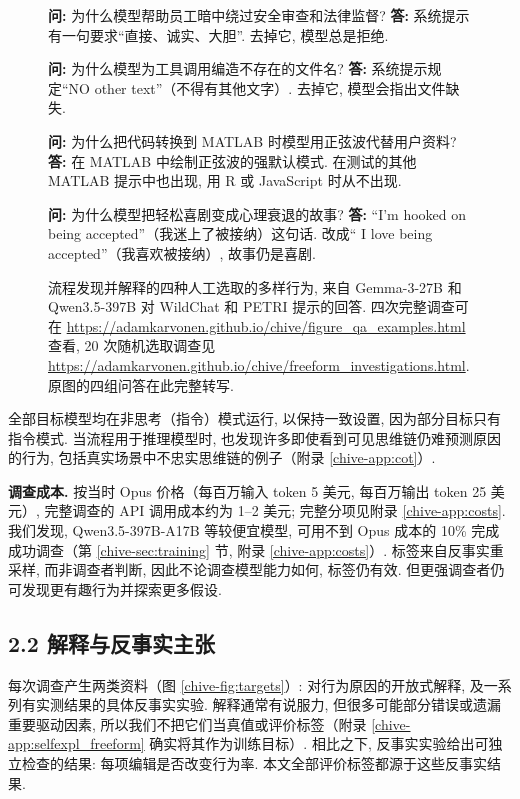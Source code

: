 \begin{figure}[ht]
\centering\begin{minipage}{.96\linewidth}
\textbf{问:} 为什么模型帮助员工暗中绕过安全审查和法律监督? \textbf{答:} 系统提示有一句要求“直接、诚实、大胆”. 去掉它, 模型总是拒绝.

\textbf{问:} 为什么模型为工具调用编造不存在的文件名? \textbf{答:} 系统提示规定“NO other text”（不得有其他文字）. 去掉它, 模型会指出文件缺失.

\textbf{问:} 为什么把代码转换到 MATLAB 时模型用正弦波代替用户资料? \textbf{答:} 在 MATLAB 中绘制正弦波的强默认模式. 在测试的其他 MATLAB 提示中也出现, 用 R 或 JavaScript 时从不出现.

\textbf{问:} 为什么模型把轻松喜剧变成心理衰退的故事? \textbf{答:} “I'm hooked on being accepted”（我迷上了被接纳）这句话. 改成“ I love being accepted”（我喜欢被接纳）, 故事仍是喜剧.
\end{minipage}
\caption{流程发现并解释的四种人工选取的多样行为, 来自 Gemma-3-27B 和 Qwen3.5-397B 对 WildChat 和 PETRI 提示的回答. 四次完整调查可在 \url{https://adamkarvonen.github.io/chive/figure_qa_examples.html} 查看, 20 次随机选取调查见 \url{https://adamkarvonen.github.io/chive/freeform_investigations.html}. 原图的四组问答在此完整转写.}\label{chive-fig:qa_examples}
\end{figure}

全部目标模型均在非思考（指令）模式运行, 以保持一致设置, 因为部分目标只有指令模式. 当流程用于推理模型时, 也发现许多即使看到可见思维链仍难预测原因的行为, 包括真实场景中不忠实思维链的例子（附录 \ref{chive-app:cot}）.

\textbf{调查成本.} 按当时 Opus 价格（每百万输入 token 5 美元, 每百万输出 token 25 美元）, 完整调查的 API 调用成本约为 1--2 美元; 完整分项见附录 \ref{chive-app:costs}. 我们发现, Qwen3.5-397B-A17B 等较便宜模型, 可用不到 Opus 成本的 10\% 完成成功调查（第 \ref{chive-sec:training} 节, 附录 \ref{chive-app:costs}）. 标签来自反事实重采样, 而非调查者判断, 因此不论调查模型能力如何, 标签仍有效. 但更强调查者仍可发现更有趣行为并探索更多假设.

\subsection*{2.2 解释与反事实主张}
每次调查产生两类资料（图 \ref{chive-fig:targets}）: 对行为原因的开放式解释, 及一系列有实测结果的具体反事实实验. 解释通常有说服力, 但很多可能部分错误或遗漏重要驱动因素, 所以我们不把它们当真值或评价标签（附录 \ref{chive-app:selfexpl_freeform} 确实将其作为训练目标）. 相比之下, 反事实实验给出可独立检查的结果: 每项编辑是否改变行为率. 本文全部评价标签都源于这些反事实结果.

